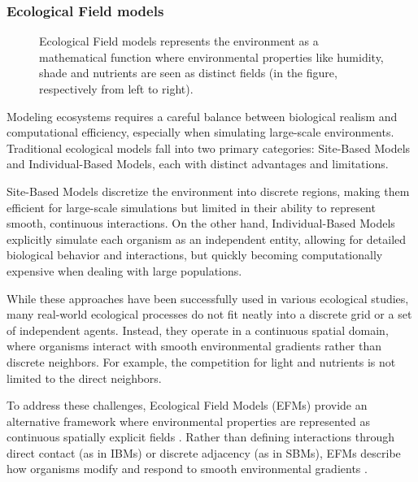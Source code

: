 \subsubsection{Ecological Field models}

\begin{figure}[H]
    \centering
    \caption{Ecological Field models represents the environment as a mathematical function where environmental properties like humidity, shade and nutrients are seen as distinct fields (in the figure, respectively from left to right). }
    \label{fig:env-obj-ecological-field-models}    
\end{figure}

Modeling ecosystems requires a careful balance between biological realism and computational efficiency, especially when simulating large-scale environments. Traditional ecological models fall into two primary categories: Site-Based Models and Individual-Based Models, each with distinct advantages and limitations.

Site-Based Models discretize the environment into discrete regions, making them efficient for large-scale simulations but limited in their ability to represent smooth, continuous interactions. On the other hand, Individual-Based Models explicitly simulate each organism as an independent entity, allowing for detailed biological behavior and interactions, but quickly becoming computationally expensive when dealing with large populations.

While these approaches have been successfully used in various ecological studies, many real-world ecological processes do not fit neatly into a discrete grid or a set of independent agents. Instead, they operate in a continuous spatial domain, where organisms interact with smooth environmental gradients rather than discrete neighbors. For example, the competition for light and nutrients is not limited to the direct neighbors.

To address these challenges, Ecological Field Models (EFMs) provide an alternative framework where environmental properties are represented as continuous spatially explicit fields \cite{Wu1985}. Rather than defining interactions through direct contact (as in IBMs) or discrete adjacency (as in SBMs), EFMs describe how organisms modify and respond to smooth environmental gradients \cite{Chng2011b,Seidl2012}.

